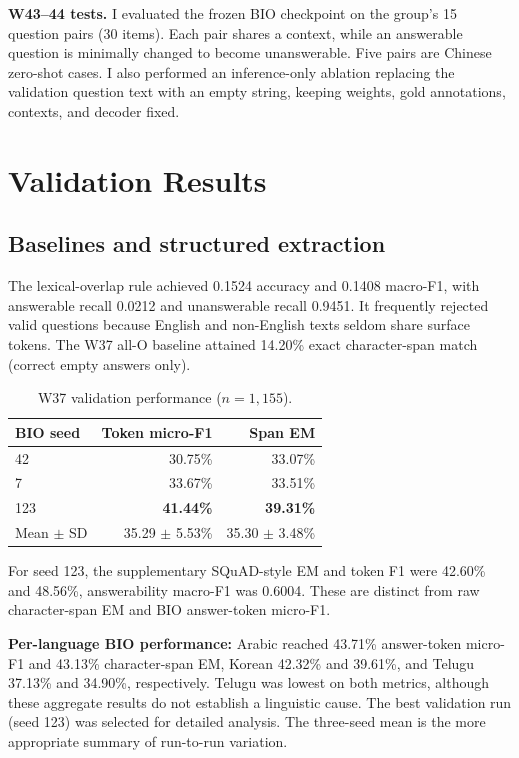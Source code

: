 \documentclass[11pt,a4paper,twocolumn]{article}
\begin{document}
\textbf{W43--44 tests.} I evaluated the frozen BIO checkpoint on the group's 15 question pairs (30 items). Each pair shares a context, while an answerable question is minimally changed to become unanswerable. Five pairs are Chinese zero-shot cases. I also performed an inference-only ablation replacing the validation question text with an empty string, keeping weights, gold annotations, contexts, and decoder fixed.

\section{Validation Results}
\subsection{Baselines and structured extraction}
The lexical-overlap rule achieved 0.1524 accuracy and 0.1408 macro-F1, with answerable recall 0.0212 and unanswerable recall 0.9451. It frequently rejected valid questions because English and non-English texts seldom share surface tokens. The W37 all-O baseline attained 14.20\% exact character-span match (correct empty answers only).

\begin{table}[htbp]
\centering\footnotesize
\begin{tabular}{@{}lrr@{}}
\toprule
BIO seed & Token micro-F1 & Span EM \\
\midrule
42  & 30.75\% & 33.07\% \\
7   & 33.67\% & 33.51\% \\
123 & \textbf{41.44\%} & \textbf{39.31\%} \\
Mean $\pm$ SD & 35.29 $\pm$ 5.53\% & 35.30 $\pm$ 3.48\% \\
\bottomrule
\end{tabular}
\caption{W37 validation performance ($n=1{,}155$).}
\label{tab:bio}
\end{table}

For seed 123, the supplementary SQuAD-style EM and token F1 were 42.60\% and 48.56\%, answerability macro-F1 was 0.6004. These are distinct from raw character-span EM and BIO answer-token micro-F1.

\textbf{Per-language BIO performance:} Arabic reached 43.71\% answer-token micro-F1 and 43.13\% character-span EM, Korean 42.32\% and 39.61\%, and Telugu 37.13\% and 34.90\%, respectively. Telugu was lowest on both metrics, although these aggregate results do not establish a linguistic cause. The best validation run (seed 123) was selected for detailed analysis. The three-seed mean is the more appropriate summary of run-to-run variation.
\end{document}
